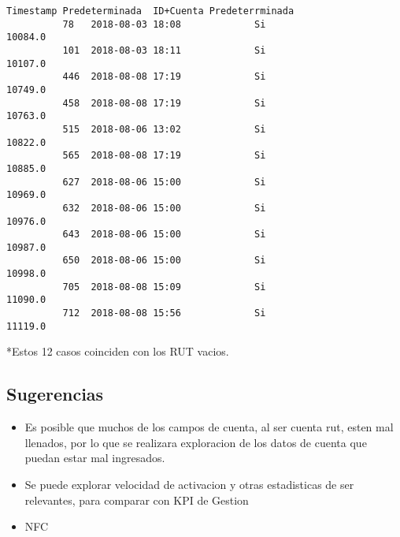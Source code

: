 \documentclass[11pt]{article}
\providecommand{\tightlist}{%
      \setlength{\itemsep}{0pt}\setlength{\parskip}{0pt}}
\begin{document}
\begin{Verbatim}[commandchars=\\\{\}]
                      Timestamp Predeterminada  ID+Cuenta Predeterrminada  
          78   2018-08-03 18:08             Si                    10084.0  
          101  2018-08-03 18:11             Si                    10107.0  
          446  2018-08-08 17:19             Si                    10749.0  
          458  2018-08-08 17:19             Si                    10763.0  
          515  2018-08-06 13:02             Si                    10822.0  
          565  2018-08-08 17:19             Si                    10885.0  
          627  2018-08-06 15:00             Si                    10969.0  
          632  2018-08-06 15:00             Si                    10976.0  
          643  2018-08-06 15:00             Si                    10987.0  
          650  2018-08-06 15:00             Si                    10998.0  
          705  2018-08-08 15:09             Si                    11090.0  
          712  2018-08-08 15:56             Si                    11119.0  
\end{Verbatim}
            
    *Estos 12 casos coinciden con los RUT vacios.

    \subsection{Sugerencias}\label{sugerencias}

    \begin{itemize}
\tightlist
\item
  Es posible que muchos de los campos de cuenta, al ser cuenta rut,
  esten mal llenados, por lo que se realizara exploracion de los datos
  de cuenta que puedan estar mal ingresados.
\end{itemize}

    \begin{itemize}
\tightlist
\item
  Se puede explorar velocidad de activacion y otras estadisticas de ser
  relevantes, para comparar con KPI de Gestion
\end{itemize}

    \begin{itemize}
\tightlist
\item
  NFC
\end{itemize}


    
    
    
    
\end{document}
